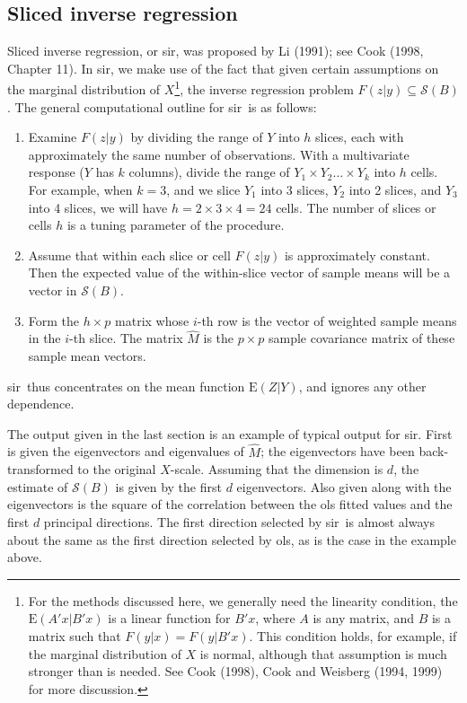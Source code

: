 \documentclass{article}
\newcommand{\sir}{{\sffamily sir}}
\renewcommand{\span}{{\mathcal S}}
\newcommand{\E}{\mbox{E}}
\begin{document}
\subsection{Sliced inverse regression}\label{sec:sir}
Sliced inverse regression, or \sir, was proposed by Li (1991); see Cook
(1998, Chapter 11).  In \sir, we
make use of the fact that given certain assumptions on the marginal
distribution of $X$\footnote{For the methods discussed here, we generally
need the linearity condition, the $\E(A'x|B'x)$ is a linear function for
$B'x$,
where $A$ is any matrix, and $B$ is a matrix such that $F(y|x) = F(y|B'x)$.
This condition holds, for example, if the marginal distribution of $X$ is
normal, although that assumption is much stronger than is needed.  See Cook
(1998), Cook and Weisberg (1994, 1999) for more discussion.}, the inverse regression problem $F(z|y) \subseteq
\span(B)$.  The general computational outline for \sir\ is as follows:
\begin{enumerate}
    \item Examine $F(z|y)$ by dividing the range of $Y$ into $h$ slices,
    each with approximately the same number of observations.  With a
    multivariate response ($Y$ has $k$ columns), divide the range of
    $Y_1 \times Y_2 \ldots \times Y_k$ into $h$ cells.  For example,
    when
    $k = 3$, and we slice $Y_1$ into 3 slices, $Y_2$ into 2 slices, and
    $Y_3$ into 4 slices, we will have $h=2\times3\times4=24$ cells.
    The number
    of slices or cells $h$ is a tuning parameter of the procedure.
    \item Assume that within each slice or cell $F(z|y)$ is approximately
    constant.  Then the expected value of the within-slice vector of
    sample means will be a vector in $\span(B)$.
    \item  Form the $h \times p$ matrix whose $i$-th row is
    the vector of weighted sample means in the $i$-th slice.
    The matrix $\hat{M}$
    is the $p \times p$ sample covariance matrix of these sample mean
    vectors.
\end{enumerate}
\sir\ thus concentrates on the mean function $\E(Z|Y)$, and ignores any
other dependence.

The output given in the last section is an example of typical output for
\sir.  First is given the eigenvectors and eigenvalues of $\hat{M}$; the
eigenvectors have been back-transformed to the original $X$-scale.
Assuming that the dimension is $d$, the estimate of $\span(B)$ is given by
the first $d$ eigenvectors.  Also given along with the eigenvectors is the
square of the correlation between the ols fitted values and the first $d$
principal directions.  The first direction selected by \sir\ is almost
always about the same as the first direction selected by ols, as is the case
in the example above.
\end{document}
